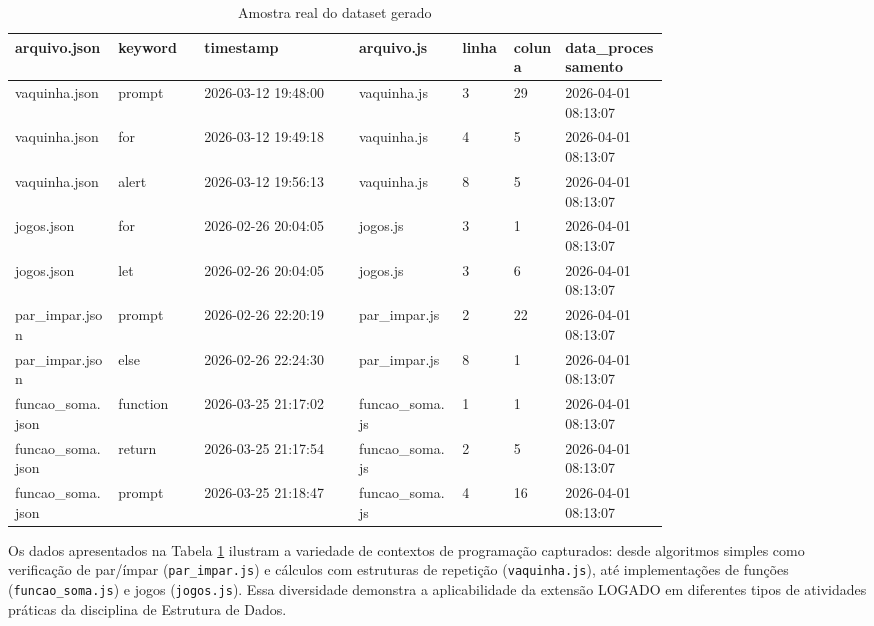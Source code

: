 \begin{table}[H]
\centering
\caption{Amostra real do dataset gerado}
\label{tab:amostra-dataset}
\small
\begin{tabular}{|p{0.12\linewidth}|p{0.10\linewidth}|p{0.18\linewidth}|p{0.12\linewidth}|p{0.06\linewidth}|p{0.06\linewidth}|p{0.12\linewidth}|}
\hline
\textbf{arquivo.json} & \textbf{keyword} & \textbf{timestamp} & \textbf{arquivo.js} & \textbf{linha} & \textbf{coluna} & \textbf{data\_processamento} \\
\hline
vaquinha.json & prompt & 2026-03-12 19:48:00 & vaquinha.js & 3 & 29 & 2026-04-01 08:13:07 \\
\hline
vaquinha.json & for & 2026-03-12 19:49:18 & vaquinha.js & 4 & 5 & 2026-04-01 08:13:07 \\
\hline
vaquinha.json & alert & 2026-03-12 19:56:13 & vaquinha.js & 8 & 5 & 2026-04-01 08:13:07 \\
\hline
jogos.json & for & 2026-02-26 20:04:05 & jogos.js & 3 & 1 & 2026-04-01 08:13:07 \\
\hline
jogos.json & let & 2026-02-26 20:04:05 & jogos.js & 3 & 6 & 2026-04-01 08:13:07 \\
\hline
par\_impar.json & prompt & 2026-02-26 22:20:19 & par\_impar.js & 2 & 22 & 2026-04-01 08:13:07 \\
\hline
par\_impar.json & else & 2026-02-26 22:24:30 & par\_impar.js & 8 & 1 & 2026-04-01 08:13:07 \\
\hline
funcao\_soma.json & function & 2026-03-25 21:17:02 & funcao\_soma.js & 1 & 1 & 2026-04-01 08:13:07 \\
\hline
funcao\_soma.json & return & 2026-03-25 21:17:54 & funcao\_soma.js & 2 & 5 & 2026-04-01 08:13:07 \\
\hline
funcao\_soma.json & prompt & 2026-03-25 21:18:47 & funcao\_soma.js & 4 & 16 & 2026-04-01 08:13:07 \\
\hline
\end{tabular}
\end{table}

Os dados apresentados na Tabela \ref{tab:amostra-dataset} ilustram a variedade de contextos de programação capturados: desde algoritmos simples como verificação de par/ímpar (\texttt{par\_impar.js}) e cálculos com estruturas de repetição (\texttt{vaquinha.js}), até implementações de funções (\texttt{funcao\_soma.js}) e jogos (\texttt{jogos.js}). Essa diversidade demonstra a aplicabilidade da extensão LOGADO em diferentes tipos de atividades práticas da disciplina de Estrutura de Dados.

